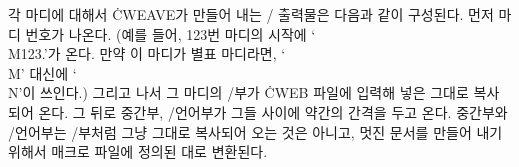 각 마디에 대해서 \.{CWEAVE}가 만들어 내는 \TEX/ 출력물은 다음과 같이
구성된다. 먼저 마디 번호가 나온다. (예를 들어, 123번 마디의
시작에 `\.{\\M123.}'가 온다. 만약 이 마디가 별표 마디라면, `\.{\\M}'
대신에 `\.{\\N}'이 쓰인다.) 그리고 나서 그 마디의 \TEX/부가 \.{CWEB}
파일에 입력해 넣은 그대로 복사되어 온다. 그 뒤로
중간부, \CEE/언어부가 그들 사이에 약간의 간격을 두고
온다. 중간부와 \CEE/언어부는 \TEX/부처럼 그냥 그대로 복사되어
오는 것은 아니고, 멋진 문서를 만들어 내기 위해서 매크로
파일에 정의된 대로 변환된다.

